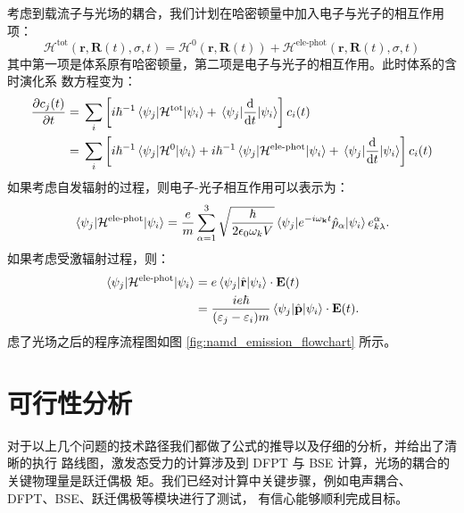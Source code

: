  考虑到载流子与光场的耦合，我们计划在哈密顿量中加入电子与光子的相互作用项：
 \begin{equation}
    \mathcal{H}^{\text{tot}}(\mathbf{r}, \mathbf{R}(t), \sigma, t)
    =
    \mathcal{H}^0 (\mathbf{r}, \mathbf{R}(t)) +
    \mathcal{H}^{\text{ele-phot}}(\mathbf{r}, \mathbf{R}(t), \sigma, t)
 \end{equation}
 其中第一项是体系原有哈密顿量，第二项是电子与光子的相互作用。此时体系的含时演化系
 数方程变为：
 \begin{equation}
 \begin{aligned}
    \frac{\partial c_j(t)}{\partial t}
        &={} \sum_i \left[ i\hbar^{-1} \mel{\psi_j}{\mathcal{H}^{\text{tot}}}{\psi_i} +
            \mel{\psi_j}{\frac{\mathrm{d}}{\mathrm{d}t}}{\psi_i} \right] c_i(t) \\
        &={} \sum_i \left[ i\hbar^{-1} \mel{\psi_j}{\mathcal{H}^0}{\psi_i} +
            i\hbar^{-1} \mel{\psi_j}{\mathcal{H}^{\text{ele-phot}}}{\psi_i} +
            \mel{\psi_j}{\frac{\mathrm{d}}{\mathrm{d}t}}{\psi_i} \right] c_i(t)
 \end{aligned}
 \end{equation}
 如果考虑自发辐射的过程，则电子-光子相互作用可以表示为：
 \begin{equation}
   \mel{\psi_j}{\mathcal{H}^{\text{ele-phot}}}{\psi_i} 
   =
   \frac{e}{m} \sum_{\alpha=1}^3 \sqrt{\frac{\hbar}{2\epsilon_0 \omega_k V}}
   \mel{\psi_j}{e^{-i\omega_{\mathbf{k}}t} \hat{p}_\alpha}{\psi_i} e_{k \lambda}^\alpha.
 \end{equation}
 如果考虑受激辐射过程，则：
 \begin{equation}
 \begin{aligned}
    \mel{\psi_j}{\mathcal{H}^{\text{ele-phot}}}{\psi_i}
        &={} e\mel{\psi_j}{\hat{\mathbf{r}}}{\psi_i} \cdot \mathbf{E}(t) \\
        &={} \frac{ie\hbar}{(\varepsilon_j - \varepsilon_i)m} \mel{\psi_j}{\hat{\mathbf{p}}}{\psi_i} \cdot \mathbf{E}(t).
 \end{aligned}
 \end{equation}
虑了光场之后的程序流程图如图 \ref{fig:namd_emission_flowchart} 所示。


\section{可行性分析}

对于以上几个问题的技术路径我们都做了公式的推导以及仔细的分析，并给出了清晰的执行
路线图，激发态受力的计算涉及到 DFPT 与 BSE 计算，光场的耦合的关键物理量是跃迁偶极
矩。我们已经对计算中关键步骤，例如电声耦合、DFPT、BSE、跃迁偶极等模块进行了测试，
有信心能够顺利完成目标。
